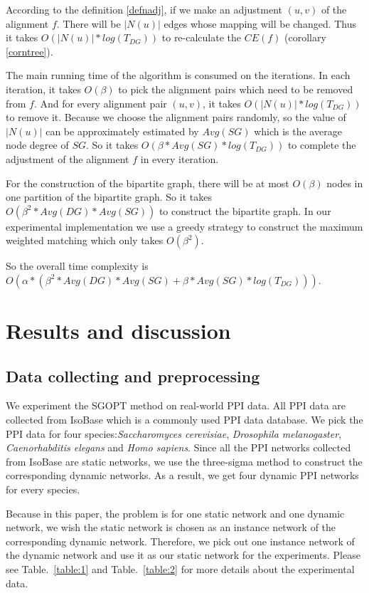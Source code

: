 \documentclass{bioinfo}
\theoremstyle{definition}
\begin{document}
According to the definition \ref{defnadj}, if we make an adjustment $(u,v)$ of the alignment $f$. There will be $|N(u)|$ edges whose mapping will be changed. Thus it takes $O(|N(u)|*log(T_{DG}))$ to re-calculate the $CE(f)$ (corollary \ref{corntree}).

The main running time of the algorithm is consumed on the iterations. In each iteration, it takes $O(\beta)$ to pick the alignment pairs which need to be removed from $f$. And for every alignment pair $(u,v)$, it takes $O(|N(u)|*log(T_{DG}))$ to remove it. Because we choose the alignment pairs randomly, so the value of $|N(u)|$ can be approximately estimated by $Avg(SG)$ which is the average node degree of $SG$. So it takes $O(\beta*Avg(SG)*log(T_{DG}))$ to complete the adjustment of the alignment $f$ in every iteration.

For the construction of the bipartite graph, there will be at most $O(\beta)$ nodes in one partition of the bipartite graph. So it takes $O(\beta^2*Avg(DG)*Avg(SG))$ to construct the bipartite graph. In our experimental implementation we use a greedy strategy to construct the maximum weighted matching which only takes $O(\beta^2)$.

So the overall time complexity is $O(\alpha*(\beta^2*Avg(DG)*Avg(SG)+\beta*Avg(SG)*log(T_{DG})))$.


\section{Results and discussion}
\subsection{Data collecting and preprocessing}
We experiment the SGOPT method on real-world PPI data. All PPI data are collected from IsoBase \citep{park2011isobase} which is a commonly used PPI data database. We pick the PPI data for four species:\textit{Saccharomyces cerevisiae}, \textit{Drosophila melanogaster}, \textit{Caenorhabditis elegans} and \textit{Homo sapiens}. Since all the PPI networks collected from IsoBase are static networks, we use the three-sigma method\citep{zhang2016construction} to construct the corresponding dynamic networks. As a result, we get four dynamic PPI networks for every species.

Because in this paper, the problem is for one static network and one dynamic network, we wish the static network is chosen as an instance network of the corresponding dynamic network. Therefore, we pick out one instance network of the dynamic network and use it as our static network for the experiments. Please see Table.~\ref{table:1} and Table.~\ref{table:2} for more details about the experimental data.
\end{document}
